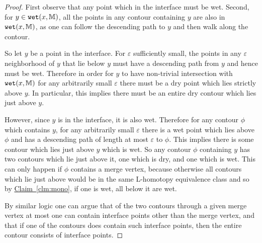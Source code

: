 \documentclass[11pt]{article}
\theoremstyle{definition}
\newcommand{\MM}{\mathbb{M}}
\newcommand{\eps}{\varepsilon}
\newcommand{\Clm}[1]{\hyperref[clm:#1]{Claim~\ref*{clm:#1}}} %
\newcommand{\wet}{{\tt wet}}
\begin{document}
\begin{proof}
 First observe that any point which in the interface must be wet.  Second, for $y \in \wet(x,\MM)$, all the points in any contour containing $y$ are also in $\wet(x,\MM)$, 
 as one can follow the descending path to $y$ and then walk along the contour.
 
 So let $y$ be a point in the interface.
 For $\eps$ sufficiently small, the points in any $\eps$ neighborhood of $y$ that lie below $y$ must have a descending path from $y$ and hence must be wet.
 Therefore in order for $y$ to have non-trivial intersection with $\wet(x,\MM)$ for any arbitrarily small $\eps$ there must be a dry point which lies 
 strictly above $y$.  In particular, this implies there must be an entire dry contour which lies just above $y$.
 
 However, since $y$ is in the interface, it is also wet.  Therefore for any contour $\phi$ which contains $y$, for any arbitrarily small $\eps$ there is 
 a wet point which lies above $\phi$ and has a descending path of length at most $\eps$ to $\phi$.
 This implies there is some contour which lies just 
 above $y$ which is wet.  So any contour $\phi$ containing $y$ has two contours which lie just above it, one which is dry, and one which is wet.  
 This can only happen if $\phi$ contains a merge vertex, because otherwise all contours which lie just above would be in the same L-homotopy equivalence class and so by 
 \Clm{mono}, if one is wet, all below it are wet.
 
 By similar logic one can argue that of the two contours through a given merge vertex at most one can contain interface points other than the merge vertex, 
 and that if one of the contours does contain such interface points, then the entire contour consists of interface points.
\end{proof}

% 
% 
\end{document}
